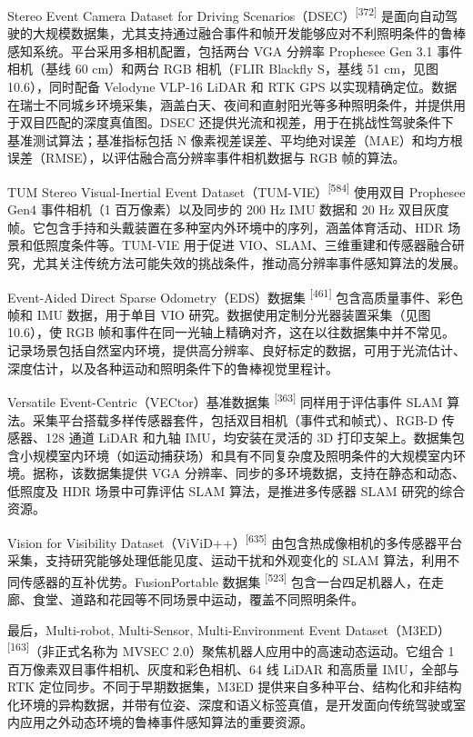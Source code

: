 Stereo Event Camera Dataset for Driving Scenarios（DSEC）\textsuperscript{[372]} 是面向自动驾驶的大规模数据集，尤其支持通过融合事件和帧开发能够应对不利照明条件的鲁棒感知系统。平台采用多相机配置，包括两台 VGA 分辨率 Prophesee Gen 3.1 事件相机（基线 60 cm）和两台 RGB 相机（FLIR Blackfly S，基线 51 cm，见图 10.6），同时配备 Velodyne VLP-16 LiDAR 和 RTK GPS 以实现精确定位。数据在瑞士不同城乡环境采集，涵盖白天、夜间和直射阳光等多种照明条件，并提供用于双目匹配的深度真值图。DSEC 还提供光流和视差，用于在挑战性驾驶条件下基准测试算法；基准指标包括 N 像素视差误差、平均绝对误差（MAE）和均方根误差（RMSE），以评估融合高分辨率事件相机数据与 RGB 帧的算法。

TUM Stereo Visual-Inertial Event Dataset（TUM-VIE）\textsuperscript{[584]} 使用双目 Prophesee Gen4 事件相机（1 百万像素）以及同步的 200 Hz IMU 数据和 20 Hz 双目灰度帧。它包含手持和头戴装置在多种室内外环境中的序列，涵盖体育活动、HDR 场景和低照度条件等。TUM-VIE 用于促进 VIO、SLAM、三维重建和传感器融合研究，尤其关注传统方法可能失效的挑战条件，推动高分辨率事件感知算法的发展。

Event-Aided Direct Sparse Odometry（EDS）数据集 \textsuperscript{[461]} 包含高质量事件、彩色帧和 IMU 数据，用于单目 VIO 研究。数据使用定制分光器装置采集（见图 10.6），使 RGB 帧和事件在同一光轴上精确对齐，这在以往数据集中并不常见。记录场景包括自然室内环境，提供高分辨率、良好标定的数据，可用于光流估计、深度估计，以及各种运动和照明条件下的鲁棒视觉里程计。

Versatile Event-Centric（VECtor）基准数据集 \textsuperscript{[363]} 同样用于评估事件 SLAM 算法。采集平台搭载多样传感器套件，包括双目相机（事件式和帧式）、RGB-D 传感器、128 通道 LiDAR 和九轴 IMU，均安装在灵活的 3D 打印支架上。数据集包含小规模室内环境（如运动捕获场）和具有不同复杂度及照明条件的大规模室内环境。据称，该数据集提供 VGA 分辨率、同步的多环境数据，支持在静态和动态、低照度及 HDR 场景中可靠评估 SLAM 算法，是推进多传感器 SLAM 研究的综合资源。

Vision for Visibility Dataset（ViViD++）\textsuperscript{[635]} 由包含热成像相机的多传感器平台采集，支持研究能够处理低能见度、运动干扰和外观变化的 SLAM 算法，利用不同传感器的互补优势。FusionPortable 数据集 \textsuperscript{[523]} 包含一台四足机器人，在走廊、食堂、道路和花园等不同场景中运动，覆盖不同照明条件。

最后，Multi-robot, Multi-Sensor, Multi-Environment Event Dataset（M3ED）\textsuperscript{[163]}（非正式名称为 MVSEC 2.0）聚焦机器人应用中的高速动态运动。它组合 1 百万像素双目事件相机、灰度和彩色相机、64 线 LiDAR 和高质量 IMU，全部与 RTK 定位同步。不同于早期数据集，M3ED 提供来自多种平台、结构化和非结构化环境的异构数据，并带有位姿、深度和语义标签真值，是开发面向传统驾驶或室内应用之外动态环境的鲁棒事件感知算法的重要资源。

